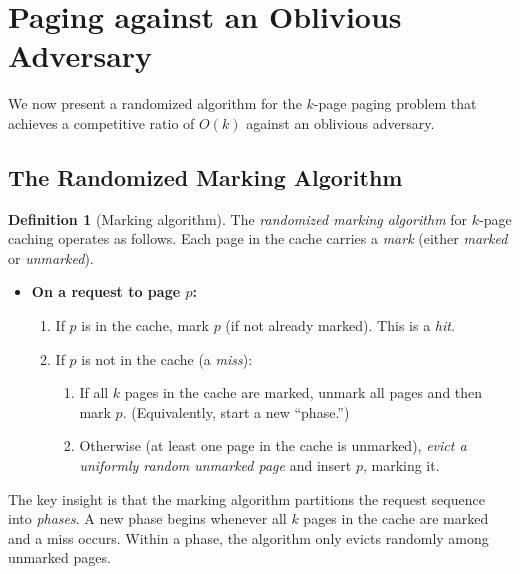 \documentclass[twoside,12pt]{book}
\theoremstyle{plain}
\theoremstyle{definition}
\newtheorem{definition}[theorem]{Definition}
\theoremstyle{remark}
\begin{document}
\section{Paging against an Oblivious Adversary}
\label{sec:paging-oblivious}

We now present a randomized algorithm for the $k$-page paging problem
that achieves a competitive ratio of $O(k)$ against an oblivious
adversary.

\subsection{The Randomized Marking Algorithm}

\begin{definition}[Marking algorithm]\label{def:marking}
The \emph{randomized marking algorithm} for $k$-page caching operates
as follows.  Each page in the cache carries a \emph{mark} (either
\emph{marked} or \emph{unmarked}).

\begin{itemize}[nosep]
  \item \textbf{On a request to page $p$:}
    \begin{enumerate}
      \item If $p$ is in the cache, mark $p$ (if not already marked).
            This is a \emph{hit}.
      \item If $p$ is not in the cache (a \emph{miss}):
        \begin{enumerate}
          \item If all $k$ pages in the cache are marked, unmark all
                pages and then mark $p$.  (Equivalently, start a new
                ``phase.'')
          \item Otherwise (at least one page in the cache is unmarked),
                \emph{evict a uniformly random unmarked page} and
                insert $p$, marking it.
        \end{enumerate}
    \end{enumerate}
\end{itemize}
\end{definition}

The key insight is that the marking algorithm partitions the request
sequence into \emph{phases}.  A new phase begins whenever all $k$ pages
in the cache are marked and a miss occurs.  Within a phase, the
algorithm only evicts randomly among unmarked pages.
\end{document}
